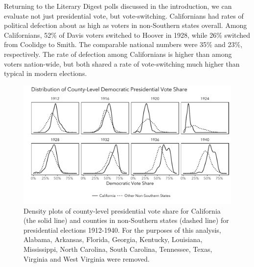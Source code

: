 \documentclass[11pt]{scrartcl}\usepackage[]{graphicx}\usepackage[]{color}
\makeatletter
\def\maxwidth{ %
  \ifdim\Gin@nat@width>\linewidth
    \linewidth
  \else
    \Gin@nat@width
  \fi
}
\newenvironment{knitrout}{}{} %
\makeatother
\begin{document}
Returning to the Literary Digest polls discussed in the introduction, we can evaluate not just presidential vote, but vote-switching. Californians had rates of political defection about as high as voters in non-Southern states overall. Among Californians, 52\% of Davis voters switched to Hoover in 1928, while 26\% switched from Coolidge to Smith.  The comparable national numbers were 35\% and 23\%, respectively. The rate of defection among Californians is higher than among voters nation-wide, but both shared a rate of vote-switching much higher than typical in modern elections.




\begin{knitrout}
\color{fgcolor}\begin{figure}

{\centering \includegraphics[width=\maxwidth]{figures/plots-countydensity-1} 

}

\caption[Density plots of county-level presidential vote share for California (the solid line) and counties in non-Southern states (dashed line) for presidential elections 1912-1940]{Density plots of county-level presidential vote share for California (the solid line) and counties in non-Southern states (dashed line) for presidential elections 1912-1940. For the purposes of this analysis, Alabama,	Arkansas,	Florida,	Georgia,	Kentucky,	Louisiana,	Mississippi,	North Carolina,	South Carolina,	Tennessee,	Texas,	Virginia and	West Virginia were removed.}\label{fig:countydensity}
\end{figure}


\end{knitrout}

\FloatBarrier
\end{document}

